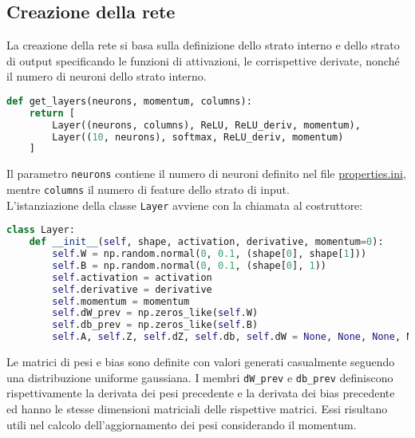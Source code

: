 \subsection{Creazione della rete}
La creazione della rete si basa sulla definizione dello strato interno e dello strato di output specificando le funzioni di attivazioni, le corrispettive derivate, nonché il numero di neuroni dello strato interno.
\begin{lstlisting}[language=Python]
def get_layers(neurons, momentum, columns):
    return [
        Layer((neurons, columns), ReLU, ReLU_deriv, momentum), 
        Layer((10, neurons), softmax, ReLU_deriv, momentum)
    ]
\end{lstlisting}
Il parametro \texttt{neurons} contiene il numero di neuroni definito nel file \underline{properties.ini}, mentre \texttt{columns} il numero di feature dello strato di input. \\
L'istanziazione della classe \texttt{Layer} avviene con la chiamata al costruttore:
\begin{lstlisting}[language=Python]
class Layer:
    def __init__(self, shape, activation, derivative, momentum=0):
        self.W = np.random.normal(0, 0.1, (shape[0], shape[1]))
        self.B = np.random.normal(0, 0.1, (shape[0], 1))
        self.activation = activation
        self.derivative = derivative
        self.momentum = momentum
        self.dW_prev = np.zeros_like(self.W)
        self.db_prev = np.zeros_like(self.B)
        self.A, self.Z, self.dZ, self.db, self.dW = None, None, None, None, None
\end{lstlisting}
Le matrici di pesi e bias sono definite con valori generati casualmente seguendo una distribuzione uniforme gaussiana. I membri \texttt{dW\_prev} e \texttt{db\_prev} definiscono rispettivamente la derivata dei pesi precedente e la derivata dei bias precedente ed hanno le stesse dimensioni matriciali delle rispettive matrici. Essi risultano utili nel calcolo dell'aggiornamento dei pesi considerando il momentum. \\

